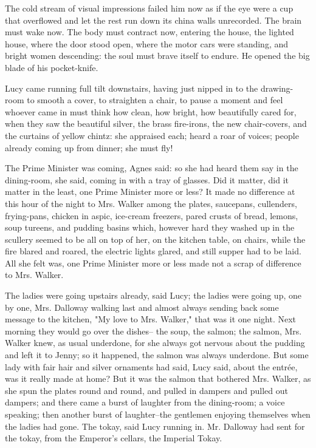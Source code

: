 \documentclass[lang=cn,10pt]{elegantbook}
\begin{document}
The cold stream of visual impressions failed him now as if the eye
were a cup that overflowed and let the rest run down its china
walls unrecorded.  The brain must wake now.  The body must contract
now, entering the house, the lighted house, where the door stood
open, where the motor cars were standing, and bright women
descending: the soul must brave itself to endure.  He opened the
big blade of his pocket-knife.



Lucy came running full tilt downstairs, having just nipped in to
the drawing-room to smooth a cover, to straighten a chair, to pause
a moment and feel whoever came in must think how clean, how bright,
how beautifully cared for, when they saw the beautiful silver, the
brass fire-irons, the new chair-covers, and the curtains of yellow
chintz: she appraised each; heard a roar of voices; people already
coming up from dinner; she must fly!

The Prime Minister was coming, Agnes said: so she had heard them
say in the dining-room, she said, coming in with a tray of glasses.
Did it matter, did it matter in the least, one Prime Minister more
or less?  It made no difference at this hour of the night to Mrs.
Walker among the plates, saucepans, cullenders, frying-pans,
chicken in aspic, ice-cream freezers, pared crusts of bread,
lemons, soup tureens, and pudding basins which, however hard they
washed up in the scullery seemed to be all on top of her, on the
kitchen table, on chairs, while the fire blared and roared, the
electric lights glared, and still supper had to be laid.  All she
felt was, one Prime Minister more or less made not a scrap of
difference to Mrs. Walker.

The ladies were going upstairs already, said Lucy; the ladies were
going up, one by one, Mrs. Dalloway walking last and almost always
sending back some message to the kitchen, "My love to Mrs. Walker,"
that was it one night.  Next morning they would go over the dishes--
the soup, the salmon; the salmon, Mrs. Walker knew, as usual
underdone, for she always got nervous about the pudding and left it
to Jenny; so it happened, the salmon was always underdone.  But
some lady with fair hair and silver ornaments had said, Lucy said,
about the entrée, was it really made at home?  But it was the
salmon that bothered Mrs. Walker, as she spun the plates round and
round, and pulled in dampers and pulled out dampers; and there came
a burst of laughter from the dining-room; a voice speaking; then
another burst of laughter--the gentlemen enjoying themselves when
the ladies had gone.  The tokay, said Lucy running in.  Mr.
Dalloway had sent for the tokay, from the Emperor's cellars, the
Imperial Tokay.
\end{document}
